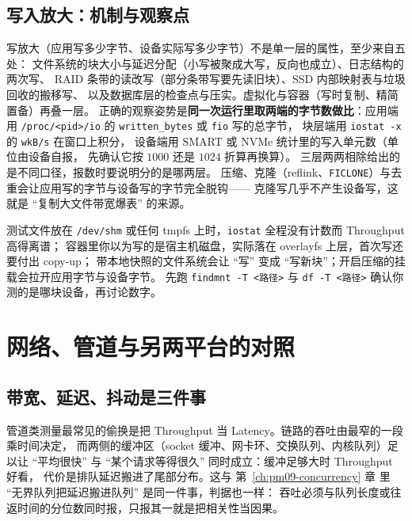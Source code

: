 \documentclass[12pt,a4paper,fontset=fandol]{ctexbook}
\newcommand{\Tp}[1]{\texttt{#1}}
\newcommand{\Lang}[1]{\textsf{#1}}
\newcommand{\MLat}{\Lang{Latency}}
\newcommand{\MThr}{\Lang{Throughput}}
\begin{document}
\subsection{写入放大：机制与观察点}
\label{sub:pm08-waf}

写放大（应用写多少字节、设备实际写多少字节）不是单一层的属性，至少来自五处：
文件系统的块大小与延迟分配（小写被聚成大写，反向也成立）、日志结构的两次写、
RAID 条带的读改写（部分条带写要先读旧块）、SSD 内部映射表与垃圾回收的搬移写、
以及数据库层的检查点与压实。虚拟化与容器（写时复制、精简置备）再叠一层。
正确的观察姿势是\textbf{同一次运行里取两端的字节数做比}：应用端用
\Tp{/proc/<pid>/io} 的 \Tp{written\_bytes} 或 \Tp{fio} 写的总字节，
块层端用 \Tp{iostat -x} 的 \Tp{wkB/s} 在窗口上积分，
设备端用 SMART 或 NVMe 统计里的写入单元数（单位由设备自报，
先确认它按 $1000$ 还是 $1024$ 折算再换算）。
三层两两相除给出的是不同口径，报数时要说明分的是哪两层。
压缩、克隆（reflink、\Tp{FICLONE}）与去重会让应用写的字节与设备写的字节完全脱钩——
克隆写几乎不产生设备写，这就是 ``复制大文件带宽爆表'' 的来源。

\begin{warning}[title={路径本身就能让数字失真：tmpfs、overlay、快照}]
测试文件放在 \Tp{/dev/shm} 或任何 tmpfs 上时，\Tp{iostat} 全程没有计数而 \MThr{} 高得离谱；
容器里你以为写的是宿主机磁盘，实际落在 overlayfs 上层，首次写还要付出 copy-up；
带本地快照的文件系统会让 ``写'' 变成 ``写新块''；开启压缩的挂载会拉开应用字节与设备字节。
先跑 \Tp{findmnt -T <路径>} 与 \Tp{df -T <路径>} 确认你测的是哪块设备，再讨论数字。
\end{warning}

\section{网络、管道与另两平台的对照}
\label{sec:pm08-net}

\subsection{带宽、延迟、抖动是三件事}
\label{sub:pm08-net3}

管道类测量最常见的偷换是把 \MThr{} 当 \MLat{}。链路的吞吐由最窄的一段乘时间决定，
而两侧的缓冲区（socket 缓冲、网卡环、交换队列、内核队列）足以让
``平均很快'' 与 ``某个请求等得很久'' 同时成立：缓冲足够大时 \MThr{} 好看，
代价是排队延迟搬进了尾部分布。这与 第~\ref{ch:pm09-concurrency} 章 里
``无界队列把延迟搬进队列'' 是同一件事，判据也一样：
吞吐必须与队列长度或往返时间的分位数同时报，只报其一就是把相关性当因果。
\end{document}
